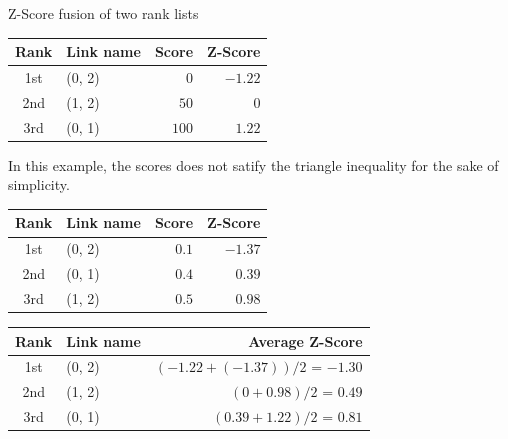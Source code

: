 \begin{example}
  \caption{Z-Score fusion of two rank lists}
  \label{ex:z_score_fusion}

  \begin{subexample}{\linewidth}
    \centering
    \begin{tabular}{c l r r}
      \toprule
      Rank & Link name & Score & Z-Score \\
      \midrule
      1st & (0, 2) & $0$ & $-1.22$ \\
      2nd & (1, 2) & $50$ & $0$ \\
      3rd & (0, 1) & $100$ & $1.22$ \\
      \bottomrule
    \end{tabular}
  \end{subexample}

  \vspace{0.5cm}

  In this example, the scores does not satify the triangle inequality for the sake of simplicity.

  \vspace{0.5cm}

  \begin{subexample}{\linewidth}
    \centering
    \begin{tabular}{c l r r}
      \toprule
      Rank & Link name & Score & Z-Score \\
      \midrule
      1st & (0, 2) & $0.1$ & $-1.37$ \\
      2nd & (0, 1) & $0.4$ & $0.39$ \\
      3rd & (1, 2) & $0.5$ & $0.98$ \\
      \bottomrule
    \end{tabular}
  \end{subexample}

  \vspace{0.5cm}

  \begin{subexample}{\linewidth}
    \centering
    \begin{tabular}{c l r}
      \toprule
      Rank & Link name & Average Z-Score \\
      \midrule
      1st & (0, 2) & $(-1.22 + (-1.37)) / 2$ = $-1.30$ \\
      2nd & (1, 2) & $(0 + 0.98) / 2$ = $0.49$ \\
      3rd & (0, 1) & $(0.39 + 1.22) / 2$ = $0.81$ \\
      \bottomrule
    \end{tabular}
  \end{subexample}

\end{example}

